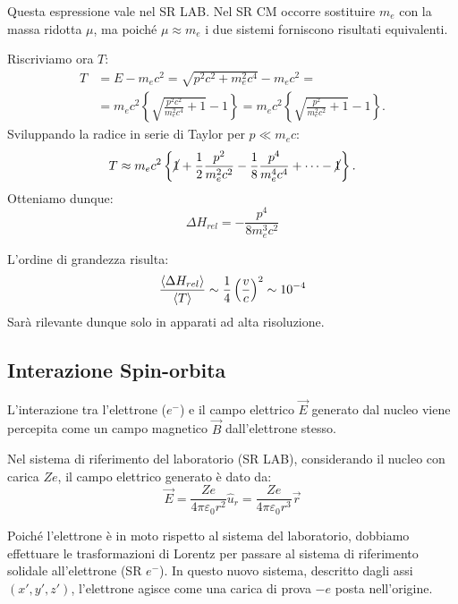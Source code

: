 \begin{remark}
    Questa espressione vale nel SR LAB. Nel SR CM occorre sostituire \(m_e\) con la massa ridotta \(\mu\), ma poiché \(\mu \approx m_e\) i due sistemi forniscono risultati equivalenti.
\end{remark}

Riscriviamo ora \(T\):
\begin{align*}
    T &= E - m_e c^2 = \sqrt{p^2 c^2 + m_e^2 c^4} - m_e c^2 = \\[1ex]
      &= m_e c^2 \left\{ \sqrt{\frac{p^2 c^2}{m_e^2 c^4} + 1} - 1 \right\} = m_e c^2 \left\{ \sqrt{\frac{p^2}{m_e^2 c^2} + 1} - 1 \right\}.
\end{align*}
Sviluppando la radice in serie di Taylor per \(p \ll m_e c\):
\begin{equation*}
    T \approx m_e c^2 \left\{ \cancel{1} + \frac{1}{2}\frac{p^2}{m_e^2 c^2} - \frac{1}{8}\frac{p^4}{m_e^4 c^4} + \dots - \cancel{1} \right\}.
\end{equation*}
Otteniamo dunque:
\begin{equation}
    \Delta H_{rel} = - \frac{p^4}{8m_e^3c^2}
\end{equation}

L'ordine di grandezza risulta:
\begin{equation}
    \frac{\expval{\Delta H_{rel}}}{\expval{T}} \sim \frac{1}{4} \left( \frac{v}{c} \right)^2 \sim 10^{-4}
\end{equation}
Sarà rilevante dunque solo in apparati ad alta risoluzione.

\subsection{Interazione Spin-orbita}

L'interazione tra l'elettrone (\(e^-\)) e il campo elettrico \(\vec{E}\) generato dal nucleo viene percepita come un campo magnetico \(\vec{B}\) dall'elettrone stesso.

Nel sistema di riferimento del laboratorio (SR LAB), considerando il nucleo con carica \(Ze\), il campo elettrico generato è dato da:
\begin{equation}
    \vec{E} = \frac{Ze}{4\pi\varepsilon_0 r^2} \hat{u}_r = \frac{Ze}{4\pi\varepsilon_0 r^3} \vec{r}
\end{equation}

Poiché l'elettrone è in moto rispetto al sistema del laboratorio, dobbiamo effettuare le trasformazioni di Lorentz per passare al sistema di riferimento solidale all'elettrone (SR \(e^-\)). In questo nuovo sistema, descritto dagli assi \((x', y', z')\), l'elettrone agisce come una carica di prova \(-e\) posta nell'origine.

